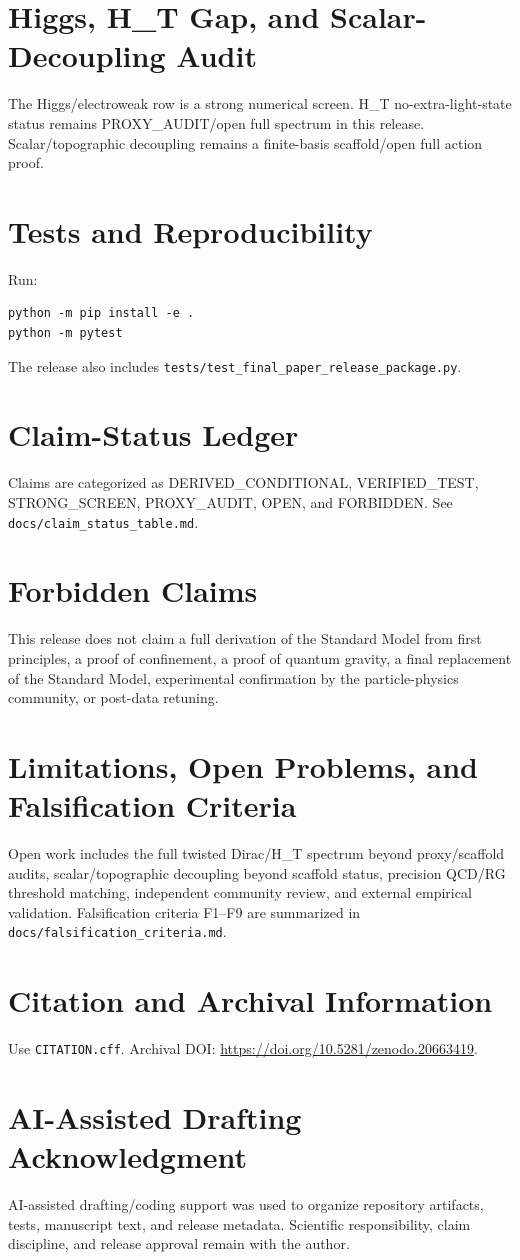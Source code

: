 \documentclass[11pt]{article}
\begin{document}
\section{Higgs, H\_T Gap, and Scalar-Decoupling Audit}
The Higgs/electroweak row is a strong numerical screen. H\_T no-extra-light-state status remains PROXY\_AUDIT/open full spectrum in this release. Scalar/topographic decoupling remains a finite-basis scaffold/open full action proof.

\section{Tests and Reproducibility}
Run:
\begin{verbatim}
python -m pip install -e .
python -m pytest
\end{verbatim}
The release also includes \texttt{tests/test\_final\_paper\_release\_package.py}.

\section{Claim-Status Ledger}
Claims are categorized as DERIVED\_CONDITIONAL, VERIFIED\_TEST, STRONG\_SCREEN, PROXY\_AUDIT, OPEN, and FORBIDDEN. See \texttt{docs/claim\_status\_table.md}.

\section{Forbidden Claims}
This release does not claim a full derivation of the Standard Model from first principles, a proof of confinement, a proof of quantum gravity, a final replacement of the Standard Model, experimental confirmation by the particle-physics community, or post-data retuning.

\section{Limitations, Open Problems, and Falsification Criteria}
Open work includes the full twisted Dirac/H\_T spectrum beyond proxy/scaffold audits, scalar/topographic decoupling beyond scaffold status, precision QCD/RG threshold matching, independent community review, and external empirical validation. Falsification criteria F1--F9 are summarized in \texttt{docs/falsification\_criteria.md}.

\section{Citation and Archival Information}
Use \texttt{CITATION.cff}. Archival DOI: \url{https://doi.org/10.5281/zenodo.20663419}.

\section{AI-Assisted Drafting Acknowledgment}
AI-assisted drafting/coding support was used to organize repository artifacts, tests, manuscript text, and release metadata. Scientific responsibility, claim discipline, and release approval remain with the author.
\end{document}

